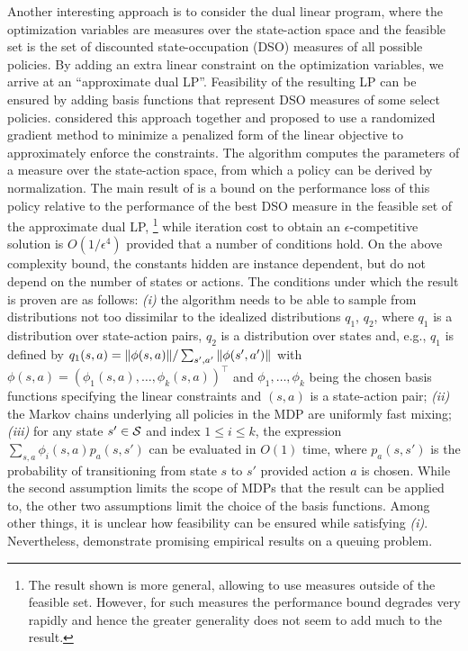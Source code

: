 \documentclass[12pt,draftcls,onecolumn]{IEEEtran}
\begin{document}
Another interesting approach is to consider the dual linear program, 
where the optimization variables are measures
over the state-action space and the feasible set is the set of  
discounted state-occupation (DSO) measures of all possible policies.
By adding an extra linear constraint on the optimization variables, 
we arrive at an ``approximate dual LP''. 
Feasibility of the resulting LP can be ensured by adding 
basis functions that represent DSO measures of some select policies.
\citet{abbbama14:dualLP} considered this approach together 
and proposed to use a randomized gradient method
to minimize a penalized form of the linear objective to approximately enforce the constraints. 
The algorithm computes the parameters of a measure over the state-action space, 
from which a policy can be derived
by normalization.
The main result of \citeauthor{abbbama14:dualLP} is a bound on the performance loss of this policy relative to the
performance of the best DSO measure in the feasible set of the approximate dual LP,%
\footnote{The result shown is more general, allowing to use measures outside of the feasible set. However,
for such measures the performance bound degrades very rapidly and hence the greater generality
does not seem to add much to the result.}
while iteration cost to obtain an $\epsilon$-competitive solution
is $O(1/\epsilon^4)$ provided that a number of conditions hold.
On the above complexity bound, the constants hidden are instance dependent, but do not depend on
the number of states or actions.
The conditions under which the result is proven are as follows:
{\em (i)} the algorithm needs to be able to sample from distributions not too dissimilar
to the idealized distributions $q_1$, $q_2$, where
$q_1$ is a distribution over state-action pairs, $q_2$ is a distribution over states
and, e.g., $q_1$ is defined by $q_1(s,a) = \norm{\phi(s,a)}/ \sum_{s',a'} \norm{\phi(s',a')}$ with $\phi(s,a) = (\phi_1(s,a),\dots,\phi_k(s,a))^\top$ and $\phi_1,\dots,\phi_k$ being the chosen basis functions specifying the linear constraints
and $(s,a)$ is a state-action pair;
{\em (ii)} the Markov chains underlying all policies in the MDP are uniformly fast mixing;
{\em (iii)} for any state $s'\in \S$ and index $1\le i \le k$, 
the expression $\sum_{s,a} \phi_i(s,a) p_a(s,s')$ can be evaluated in $O(1)$ time,
where $p_a(s,s')$ is the probability of transitioning from state $s$ to $s'$ provided action $a$ is chosen.
While the second assumption limits the scope of MDPs that the result can be applied to,
the other two assumptions limit the choice of the basis functions. 
Among other things, it is unclear how feasibility can be ensured while satisfying {\em (i)}.
Nevertheless, \citeauthor{abbbama14:dualLP} demonstrate promising empirical results on a queuing problem.
\end{document}
